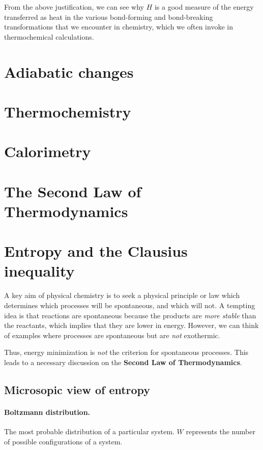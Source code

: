 \documentclass{article}
\numberwithin{theorem}{section}
\numberwithin{corollary}{section}
\numberwithin{postulate}{section}
\numberwithin{lemma}{section}
\numberwithin{definition}{section}
\begin{document}
From the above justification, we can see why $H$ is a good measure of the energy transferred as heat in the various bond-forming and bond-breaking transformations that we encounter in chemistry, which we often invoke in thermochemical calculations.

\section{Adiabatic changes}

\section{Thermochemistry}

\section{Calorimetry}

\section{The Second Law of Thermodynamics}

\pagebreak

\section{Entropy and the Clausius inequality}

A key aim of physical chemistry is to seek a physical principle or law which
determines which processes will be spontaneous, and which will not. A tempting
idea is that reactions are spontaneous because the products are \textit{more
stable} than the reactants, which implies that they are lower in energy.
However, we can think of examples where processes are spontaneous but are
\textit{not} exothermic. 

Thus, energy minimization is \textit{not} the criterion for spontaneous
processes. This leads to a necessary discussion on the \textbf{Second Law of
Thermodynamics}.

\subsection{Microsopic view of entropy}

\paragraph{Boltzmann distribution. } The most probable distribution of a
particular system. $W$ represents the number of possible configurations of a
system.
\end{document}
